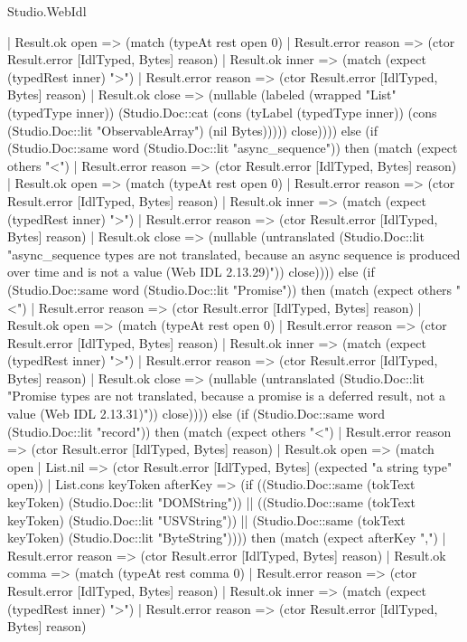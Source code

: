 \begin{lexlean}{Studio.WebIdl}
\begin{semanticmodule}
{    | Result.ok open => (match (typeAt rest open 0)
    | Result.error reason => (ctor Result.error [IdlTyped, Bytes] reason)
    | Result.ok inner => (match (expect (typedRest inner) ">")
    | Result.error reason => (ctor Result.error [IdlTyped, Bytes] reason)
    | Result.ok close => (nullable (labeled (wrapped "List" (typedType inner)) (Studio.Doc::cat (cons (tyLabel (typedType inner)) (cons (Studio.Doc::lit "ObservableArray") (nil Bytes))))) close)))) else (if (Studio.Doc::same word (Studio.Doc::lit "async_sequence")) then (match (expect others "<")
    | Result.error reason => (ctor Result.error [IdlTyped, Bytes] reason)
    | Result.ok open => (match (typeAt rest open 0)
    | Result.error reason => (ctor Result.error [IdlTyped, Bytes] reason)
    | Result.ok inner => (match (expect (typedRest inner) ">")
    | Result.error reason => (ctor Result.error [IdlTyped, Bytes] reason)
    | Result.ok close => (nullable (untranslated (Studio.Doc::lit "async_sequence types are not translated, because an async sequence is produced over time and is not a value (Web IDL 2.13.29)")) close)))) else (if (Studio.Doc::same word (Studio.Doc::lit "Promise")) then (match (expect others "<")
    | Result.error reason => (ctor Result.error [IdlTyped, Bytes] reason)
    | Result.ok open => (match (typeAt rest open 0)
    | Result.error reason => (ctor Result.error [IdlTyped, Bytes] reason)
    | Result.ok inner => (match (expect (typedRest inner) ">")
    | Result.error reason => (ctor Result.error [IdlTyped, Bytes] reason)
    | Result.ok close => (nullable (untranslated (Studio.Doc::lit "Promise types are not translated, because a promise is a deferred result, not a value (Web IDL 2.13.31)")) close)))) else (if (Studio.Doc::same word (Studio.Doc::lit "record")) then (match (expect others "<")
    | Result.error reason => (ctor Result.error [IdlTyped, Bytes] reason)
    | Result.ok open => (match open
    | List.nil => (ctor Result.error [IdlTyped, Bytes] (expected "a string type" open))
    | List.cons keyToken afterKey => (if ((Studio.Doc::same (tokText keyToken) (Studio.Doc::lit "DOMString")) || ((Studio.Doc::same (tokText keyToken) (Studio.Doc::lit "USVString")) || (Studio.Doc::same (tokText keyToken) (Studio.Doc::lit "ByteString")))) then (match (expect afterKey ",")
    | Result.error reason => (ctor Result.error [IdlTyped, Bytes] reason)
    | Result.ok comma => (match (typeAt rest comma 0)
    | Result.error reason => (ctor Result.error [IdlTyped, Bytes] reason)
    | Result.ok inner => (match (expect (typedRest inner) ">")
    | Result.error reason => (ctor Result.error [IdlTyped, Bytes] reason)
}
\end{semanticmodule}
\end{lexlean}
